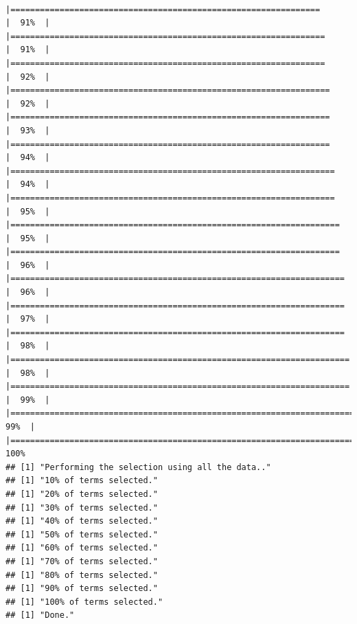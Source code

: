 \documentclass[
]{article}
\begin{document}
\begin{verbatim}
          |===============================================================       |  91%  |                                                                              |================================================================      |  91%  |                                                                              |================================================================      |  92%  |                                                                              |=================================================================     |  92%  |                                                                              |=================================================================     |  93%  |                                                                              |=================================================================     |  94%  |                                                                              |==================================================================    |  94%  |                                                                              |==================================================================    |  95%  |                                                                              |===================================================================   |  95%  |                                                                              |===================================================================   |  96%  |                                                                              |====================================================================  |  96%  |                                                                              |====================================================================  |  97%  |                                                                              |====================================================================  |  98%  |                                                                              |===================================================================== |  98%  |                                                                              |===================================================================== |  99%  |                                                                              |======================================================================|  99%  |                                                                              |======================================================================| 100%
## [1] "Performing the selection using all the data.."
## [1] "10% of terms selected."
## [1] "20% of terms selected."
## [1] "30% of terms selected."
## [1] "40% of terms selected."
## [1] "50% of terms selected."
## [1] "60% of terms selected."
## [1] "70% of terms selected."
## [1] "80% of terms selected."
## [1] "90% of terms selected."
## [1] "100% of terms selected."
## [1] "Done."
\end{verbatim}
\end{document}
